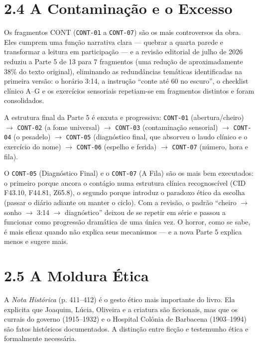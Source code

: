 \documentclass[14pt,openany]{extbook}
\newcommand{\frag}[1]{\texttt{#1}}
\begin{document}
\section*{2.4 A Contaminação e o Excesso}

Os fragmentos CONT (\frag{CONT-01} a \frag{CONT-07}) são os mais controversos da obra. Eles cumprem uma função narrativa clara --- quebrar a quarta parede e transformar a leitura em participação --- e a revisão editorial de julho de 2026 reduziu a Parte 5 de 13 para 7 fragmentos (uma redução de aproximadamente 38\% do texto original), eliminando as redundâncias temáticas identificadas na primeira versão: o horário 3:14, a instrução ``conte até 60 no escuro'', o checklist clínico A--G e os exercícios sensoriais repetiam-se em fragmentos distintos e foram consolidados.

A estrutura final da Parte 5 é enxuta e progressiva: \frag{CONT-01} (abertura/cheiro) $\rightarrow$ \frag{CONT-02} (a fome universal) $\rightarrow$ \frag{CONT-03} (contaminação sensorial) $\rightarrow$ \frag{CONT-04} (o pesadelo) $\rightarrow$ \frag{CONT-05} (diagnóstico final, que absorveu o laudo clínico e o exercício do nome) $\rightarrow$ \frag{CONT-06} (espelho e ferida) $\rightarrow$ \frag{CONT-07} (número, hora e fila).

O \frag{CONT-05} (Diagnóstico Final) e o \frag{CONT-07} (A Fila) são os mais bem executados: o primeiro porque ancora o contágio numa estrutura clínica recognoscível (CID F43.10, F44.81, Z65.8), o segundo porque introduz o paradoxo ético da escolha (passar o diário adiante ou manter o ciclo). Com a revisão, o padrão ``cheiro $\rightarrow$ sonho $\rightarrow$ 3:14 $\rightarrow$ diagnóstico'' deixou de se repetir em série e passou a funcionar como progressão dramática de uma única vez. O horror, como se sabe, é mais eficaz quando não explica seus mecanismos --- e a nova Parte 5 explica menos e sugere mais.

\section*{2.5 A Moldura Ética}

A \textit{Nota Histórica} (p. 411--412) é o gesto ético mais importante do livro. Ela explicita que Joaquim, Lúcia, Oliveira e a criatura são ficcionais, mas que os currais do governo (1915--1932) e o Hospital Colônia de Barbacena (1903--1994) são fatos históricos documentados. A distinção entre ficção e testemunho ética e formalmente necessária.
\end{document}
